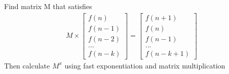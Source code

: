 Find matrix M that satisfies
\begin{align*}
M \times 
\begin{bmatrix}
f(n) \\
f(n-1) \\
f(n-2) \\
... \\
f(n-k)
\end{bmatrix}
=
\begin{bmatrix}
f(n+1) \\
f(n) \\
f(n-1) \\
... \\
f(n-k+1)
\end{bmatrix}
\end{align*}
Then calculate $ M^{x} $ using fast exponentiation and matrix multiplication